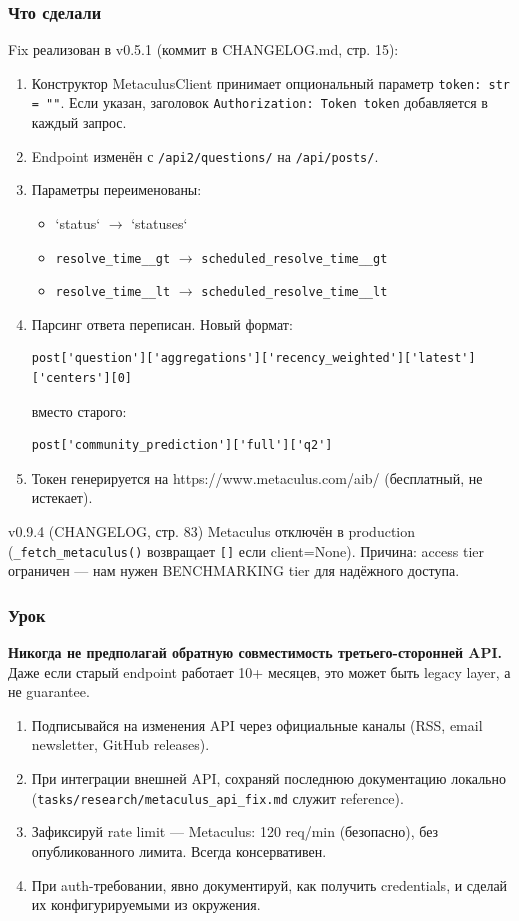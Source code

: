 \subsubsection*{Что сделали}
Fix реализован в v0.5.1 (коммит в CHANGELOG.md, стр. 15):

\begin{enumerate}
\item Конструктор MetaculusClient принимает опциональный параметр \texttt{token: str = ""}. Если указан, заголовок \texttt{Authorization: Token {token}} добавляется в каждый запрос.
\item Endpoint изменён с \texttt{/api2/questions/} на \texttt{/api/posts/}.
\item Параметры переименованы:
    \begin{itemize}
    \item `status` $\to$ `statuses`
    \item \texttt{resolve\_time\_\_gt} $\to$ \texttt{scheduled\_resolve\_time\_\_gt}
    \item \texttt{resolve\_time\_\_lt} $\to$ \texttt{scheduled\_resolve\_time\_\_lt}
    \end{itemize}
\item Парсинг ответа переписан. Новый формат:
\begin{verbatim}
post['question']['aggregations']['recency_weighted']['latest']['centers'][0]
\end{verbatim}
вместо старого:
\begin{verbatim}
post['community_prediction']['full']['q2']
\end{verbatim}
\item Токен генерируется на https://www.metaculus.com/aib/ (бесплатный, не истекает).
\end{enumerate}

v0.9.4 (CHANGELOG, стр. 83) Metaculus отключён в production (\texttt{\_fetch\_metaculus()} возвращает \texttt{[]} если client=None). Причина: access tier ограничен --- нам нужен BENCHMARKING tier для надёжного доступа.

\subsubsection*{Урок}
\textbf{Никогда не предполагай обратную совместимость третьего-сторонней API.} Даже если старый endpoint работает 10+ месяцев, это может быть legacy layer, а не guarantee.
\begin{enumerate}
\item Подписывайся на изменения API через официальные каналы (RSS, email newsletter, GitHub releases).
\item При интеграции внешней API, сохраняй последнюю документацию локально (\texttt{tasks/research/metaculus\_api\_fix.md} служит reference).
\item Зафиксируй rate limit --- Metaculus: 120 req/min (безопасно), без опубликованного лимита. Всегда консервативен.
\item При auth-требовании, явно документируй, как получить credentials, и сделай их конфигурируемыми из окружения.
\end{enumerate}

